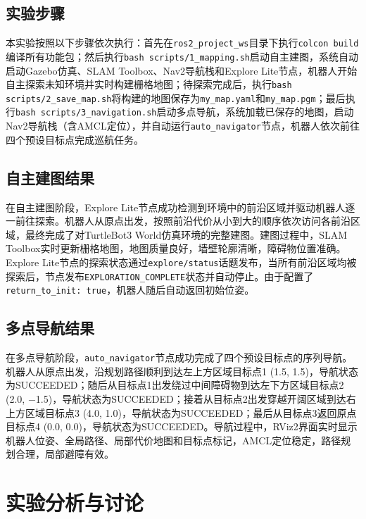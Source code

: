 \documentclass[a4paper,12pt]{article}
\begin{document}
\subsection{实验步骤}

本实验按照以下步骤依次执行：首先在\texttt{ros2\_project\_ws}目录下执行\texttt{colcon build}编译所有功能包；然后执行\texttt{bash scripts/1\_mapping.sh}启动自主建图，系统自动启动Gazebo仿真、SLAM Toolbox、Nav2导航栈和Explore Lite节点，机器人开始自主探索未知环境并实时构建栅格地图；待探索完成后，执行\texttt{bash scripts/2\_save\_map.sh}将构建的地图保存为\texttt{my\_map.yaml}和\texttt{my\_map.pgm}；最后执行\texttt{bash scripts/3\_navigation.sh}启动多点导航，系统加载已保存的地图，启动Nav2导航栈（含AMCL定位），并自动运行\texttt{auto\_navigator}节点，机器人依次前往四个预设目标点完成巡航任务。

\subsection{自主建图结果}

在自主建图阶段，Explore Lite节点成功检测到环境中的前沿区域并驱动机器人逐一前往探索。机器人从原点出发，按照前沿代价从小到大的顺序依次访问各前沿区域，最终完成了对TurtleBot3 World仿真环境的完整建图。建图过程中，SLAM Toolbox实时更新栅格地图，地图质量良好，墙壁轮廓清晰，障碍物位置准确。Explore Lite节点的探索状态通过\texttt{explore/status}话题发布，当所有前沿区域均被探索后，节点发布\texttt{EXPLORATION\_COMPLETE}状态并自动停止。由于配置了\texttt{return\_to\_init: true}，机器人随后自动返回初始位姿。

\subsection{多点导航结果}

在多点导航阶段，\texttt{auto\_navigator}节点成功完成了四个预设目标点的序列导航。机器人从原点出发，沿规划路径顺利到达左上方区域目标点1 (1.5, 1.5)，导航状态为SUCCEEDED；随后从目标点1出发绕过中间障碍物到达左下方区域目标点2 (2.0, $-$1.5)，导航状态为SUCCEEDED；接着从目标点2出发穿越开阔区域到达右上方区域目标点3 (4.0, 1.0)，导航状态为SUCCEEDED；最后从目标点3返回原点目标点4 (0.0, 0.0)，导航状态为SUCCEEDED。导航过程中，RViz2界面实时显示机器人位姿、全局路径、局部代价地图和目标点标记，AMCL定位稳定，路径规划合理，局部避障有效。

\section{实验分析与讨论}
\end{document}
